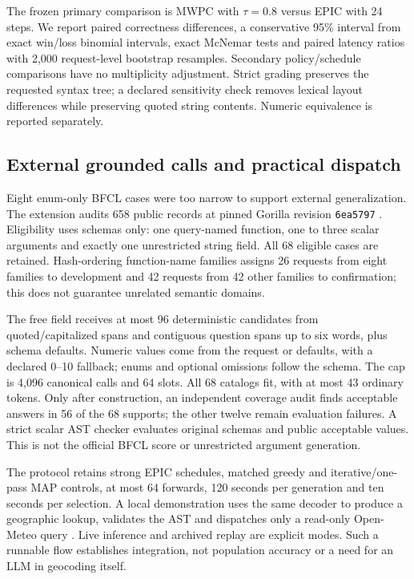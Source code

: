The frozen primary comparison is MWPC with $\tau=0.8$ versus EPIC with 24 steps. We report paired correctness differences, a conservative 95\% interval from exact win/loss binomial intervals, exact McNemar tests and paired latency ratios with 2,000 request-level bootstrap resamples. Secondary policy/schedule comparisons have no multiplicity adjustment. Strict grading preserves the requested syntax tree; a declared sensitivity check removes lexical layout differences while preserving quoted string contents. Numeric equivalence is reported separately.

\subsection{External grounded calls and practical dispatch}

Eight enum-only BFCL cases were too narrow to support external generalization. The extension audits 658 public records at pinned Gorilla revision \texttt{6ea5797} \cite{bfcldataset}. Eligibility uses schemas only: one query-named function, one to three scalar arguments and exactly one unrestricted string field. All 68 eligible cases are retained. Hash-ordering function-name families assigns 26 requests from eight families to development and 42 requests from 42 other families to confirmation; this does not guarantee unrelated semantic domains.

The free field receives at most 96 deterministic candidates from quoted/capitalized spans and contiguous question spans up to six words, plus schema defaults. Numeric values come from the request or defaults, with a declared 0--10 fallback; enums and optional omissions follow the schema. The cap is 4,096 canonical calls and 64 slots. All 68 catalogs fit, with at most 43 ordinary tokens. Only after construction, an independent coverage audit finds acceptable answers in 56 of the 68 supports; the other twelve remain evaluation failures. A strict scalar AST checker evaluates original schemas and public acceptable values. This is not the official BFCL score or unrestricted argument generation.

The protocol retains strong EPIC schedules, matched greedy and iterative/one-pass MAP controls, at most 64 forwards, 120 seconds per generation and ten seconds per selection. A local demonstration uses the same decoder to produce a geographic lookup, validates the AST and dispatches only a read-only Open-Meteo query \cite{openmeteogeocoding}. Live inference and archived replay are explicit modes. Such a runnable flow establishes integration, not population accuracy or a need for an LLM in geocoding itself.

